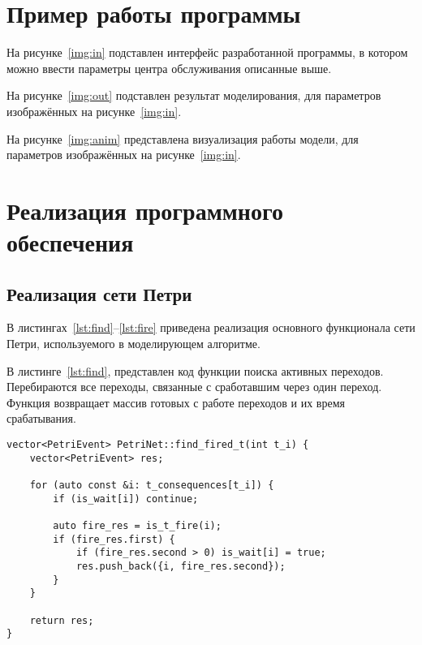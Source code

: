 \section{Пример работы программы}

На рисунке~\ref{img:in} подставлен интерфейс разработанной программы, в котором можно ввести параметры центра обслуживания описанные выше.

\FloatBarrier

На рисунке~\ref{img:out} подставлен результат моделирования, для параметров изображённых на рисунке~\ref{img:in}.

\FloatBarrier

На рисунке~\ref{img:anim} представлена визуализация работы модели, для параметров изображённых на рисунке~\ref{img:in}.

\FloatBarrier

\section{Реализация программного обеспечения}

\subsection{Реализация сети Петри}

В листингах~\ref{lst:find}--\ref{lst:fire} приведена реализация основного функционала сети Петри, используемого в моделирующем алгоритме.

В листинге~\ref{lst:find}, представлен код функции поиска активных переходов. Перебираются все переходы, связанные с сработавшим через один переход. Функция возвращает массив готовых с работе переходов и их время срабатывания.

\clearpage

\begin{center}
	\captionsetup{justification=raggedright,singlelinecheck=off}
	\begin{lstlisting}[label=lst:find,caption=Функция поиска активного перехода ,showstringspaces=false]
vector<PetriEvent> PetriNet::find_fired_t(int t_i) {
	vector<PetriEvent> res;
	
	for (auto const &i: t_consequences[t_i]) {
		if (is_wait[i]) continue;
		
		auto fire_res = is_t_fire(i);
		if (fire_res.first) {
			if (fire_res.second > 0) is_wait[i] = true;
			res.push_back({i, fire_res.second});
		}
	}
	
	return res;
}
	\end{lstlisting}
\end{center}
\FloatBarrier

